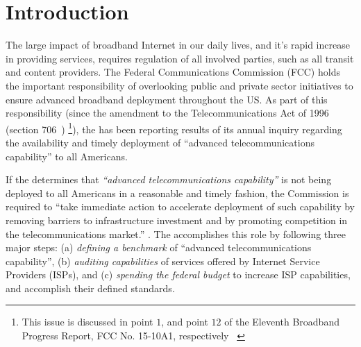 \section{Introduction}
\label{sec:intro}



The large impact of broadband Internet in our daily lives, and it’s rapid increase in providing
services, requires regulation of all involved parties, such as all transit and content providers.
The Federal Communications Commission (FCC) holds the important responsibility of overlooking public
and private sector initiatives to ensure advanced broadband deployment throughout the US. As part of
this responsibility (since the amendment to the Telecommunications Act of 1996 (section 706~\cite{fcc1996telecom-act})
\footnote{This issue is discussed in point $1$, and point $12$ of the Eleventh Broadband Progress Report,
FCC No. 15-10A1, respectively ~\cite{fcc2015progress-report}\label{foot:fcc-issues}}), 
the \FCC has been reporting results of its annual inquiry regarding the
availability and timely deployment of ``advanced telecommunications capability'' to all Americans.


If the \FCC determines that \emph{``advanced telecommunications capability''} is not being deployed
to all Americans in a reasonable and timely fashion, the Commission is required to ``take immediate
action to accelerate deployment of such capability by removing barriers to infrastructure investment
and by promoting competition in the telecommunications market.'' .
The \FCC accomplishes this role by following three major steps:
(a) \emph{defining a benchmark} of ``advanced telecommunications capability'', (b) \emph{auditing
capabilities} of services offered by Internet Service Providers (ISPs), and (c) \emph{spending the
federal budget} to increase ISP capabilities, and accomplish their defined standards.

